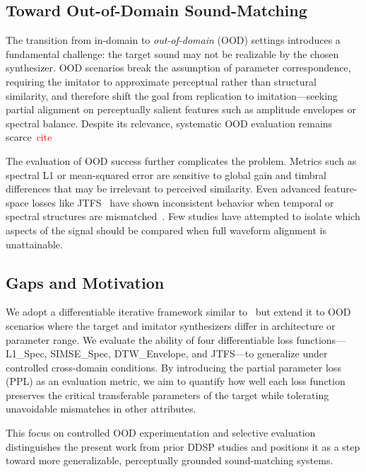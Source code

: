 \documentclass[14pt]{extarticle} %
\newcommand{\todo}[1]{\textcolor{red}{#1}}
\begin{document}
\subsection{Toward Out-of-Domain Sound-Matching}
The transition from in-domain to \emph{out-of-domain} (OOD) settings introduces a fundamental challenge: the target sound may not be realizable by the chosen synthesizer. OOD scenarios break the assumption of parameter correspondence, requiring the imitator to approximate perceptual rather than structural similarity, and therefore shift the goal from replication to imitation—seeking partial alignment on perceptually salient features such as amplitude envelopes or spectral balance.  
Despite its relevance, systematic OOD evaluation remains scarce~\todo{cite}

The evaluation of OOD success further complicates the problem.  
Metrics such as spectral L1 or mean-squared error are sensitive to global gain and timbral differences that may be irrelevant to perceived similarity.  
Even advanced feature-space losses like JTFS~\cite{vahidi2023mesostructures} have shown inconsistent behavior when temporal or spectral structures are mismatched~\cite{salimi2025soundmatching}.  
Few studies have attempted to isolate which aspects of the signal should be compared when full waveform alignment is unattainable.

\subsection{Gaps and Motivation}
We adopt a differentiable iterative framework similar to~\cite{salimi2025soundmatching} but extend it to OOD scenarios where the target and imitator synthesizers differ in architecture or parameter range.  
We evaluate the ability of four differentiable loss functions—L1\_Spec, SIMSE\_Spec, DTW\_Envelope, and JTFS—to generalize under controlled cross-domain conditions.  
By introducing the partial parameter loss (PPL) as an evaluation metric, we aim to quantify how well each loss function preserves the critical transferable parameters of the target while tolerating unavoidable mismatches in other attributes.

This focus on controlled OOD experimentation and selective evaluation distinguishes the present work from prior DDSP studies and positions it as a step toward more generalizable, perceptually grounded sound-matching systems.




\end{document}
